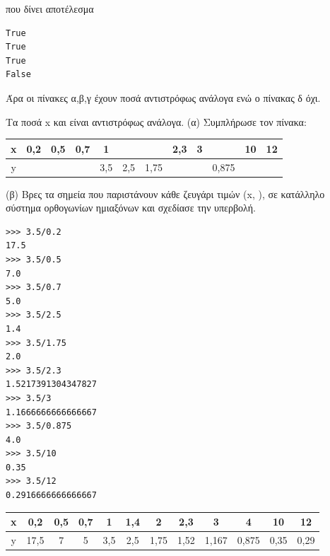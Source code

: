 που δίνει αποτέλεσμα
\begin{lstlisting}
True
True
True
False
\end{lstlisting}
Άρα οι πίνακες α,β,γ έχουν ποσά αντιστρόφως ανάλογα ενώ ο πίνακας δ όχι.
\begin{exercise}
Τα ποσά x και  είναι αντιστρόφως ανάλογα. 
(α) Συμπλήρωσε τον πίνακα: 

\begin{table}
\begin{tabular}{|c|c|c|c|c|c|c|c|c|c|c|c|}\hline
x&0,2&0,5&0,7&1      &      &      & 2,3&3&            &10&12\\\hline
y&       &     &      & 3,5 &2,5&1,75&      &   &0,875&     &\\\hline
\end{tabular}
\end{table}

(β)  Βρες τα σημεία που παριστάνουν κάθε ζευγάρι τιμών (x, ), σε κατάλληλο  σύστημα ορθογωνίων ημιαξόνων και σχεδίασε την 
υπερβολή. 
\end{exercise}
\begin{lstlisting}
>>> 3.5/0.2
17.5
>>> 3.5/0.5
7.0
>>> 3.5/0.7
5.0
>>> 3.5/2.5
1.4
>>> 3.5/1.75
2.0
>>> 3.5/2.3
1.5217391304347827
>>> 3.5/3
1.1666666666666667
>>> 3.5/0.875
4.0
>>> 3.5/10
0.35
>>> 3.5/12
0.2916666666666667
\end{lstlisting}

\begin{table}
\begin{tabular}{|c|c|c|c|c|c|c|c|c|c|c|c|}\hline
x&0,2 &0,5&0,7&1      &1,4& 2   & 2,3  &3        &4        &10   &12\\\hline
y&17,5&7    & 5  & 3,5 &2,5&1,75&1,52& 1,167&0,875&0,35 &0,29\\\hline
\end{tabular}
\end{table}

